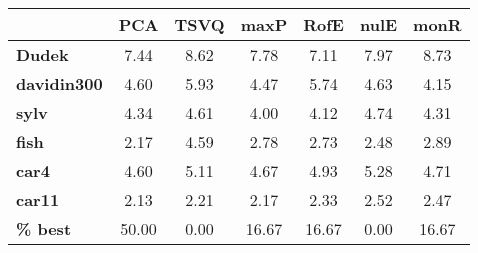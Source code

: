 \begin{tabular}{|l|c|c|c|c|c|c|}
\hline
&\textbf{PCA}&\textbf{TSVQ}&\textbf{maxP}&\textbf{RofE}&\textbf{nulE}&\textbf{monR}\\\hline
\textbf{Dudek}&7.44&8.62&7.78&7.11&7.97&8.73\\\hline
\textbf{davidin300}&4.60&5.93&4.47&5.74&4.63&4.15\\\hline
\textbf{sylv}&4.34&4.61&4.00&4.12&4.74&4.31\\\hline
\textbf{fish}&2.17&4.59&2.78&2.73&2.48&2.89\\\hline
\textbf{car4}&4.60&5.11&4.67&4.93&5.28&4.71\\\hline
\textbf{car11}&2.13&2.21&2.17&2.33&2.52&2.47\\\hline
\textbf{ \% best}&50.00&0.00&16.67&16.67&0.00&16.67\\\hline
\end{tabular}
